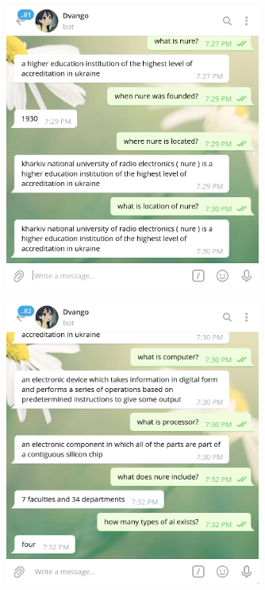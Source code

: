 \documentclass[a4paper,14pt]{extreport}
\begin{document}
    \begin{figure}[H]
        \centering
        \includegraphics[width=0.75\textwidth]{f2.png}
    \end{figure}

    \begin{figure}[H]
        \centering
        \includegraphics[width=0.75\textwidth]{f3.png}
    \end{figure}
\end{document}

